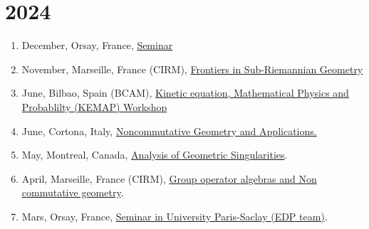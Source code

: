 \documentclass[a4paper, 13pt]{article}
\begin{document}
\section*{2024}
\begin{enumerate}
\item December, Orsay, France, \href{URL}{Seminar }
\item November, Marseille, France (CIRM), \href{https://conferences.cirm-math.fr/3091.html}{Frontiers in Sub-Riemannian Geometry}
\item June, Bilbao, Spain (BCAM), \href{https://www.bcamath.org/en/kinetic-equation-mathematical-physics-and-probablilty-kemap-workshop}{Kinetic equation, Mathematical Physics and Probablilty (KEMAP) Workshop}
\item June, Cortona, Italy, \href{https://sites.google.com/view/ncg2024cortona}{Noncommutative Geometry and Applications.}
\item May, Montreal, Canada, \href{https://www.crmath.ca/en/activities/#/type/activity/id/3895}{Analysis of Geometric Singularities}.
\item April, Marseille, France (CIRM), \href{https://conferences.cirm-math.fr/2987.html}{Group operator algebras and Non commutative geometry}.
\item Mars, Orsay, France, \href{https://www.imo.universite-paris-saclay.fr/fr/events/7287}{Seminar in University Paris-Saclay (EDP team)}.
\end{enumerate}
\end{document}
